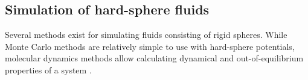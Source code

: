 
\subsection{Simulation of hard-sphere fluids}
Several methods exist for simulating fluids consisting of rigid spheres.
While Monte Carlo methods are relatively simple to use with hard-sphere potentials, 
molecular dynamics methods allow calculating dynamical and out-of-equilibrium properties of a system \cite{ref:allen:MD_sim}.



